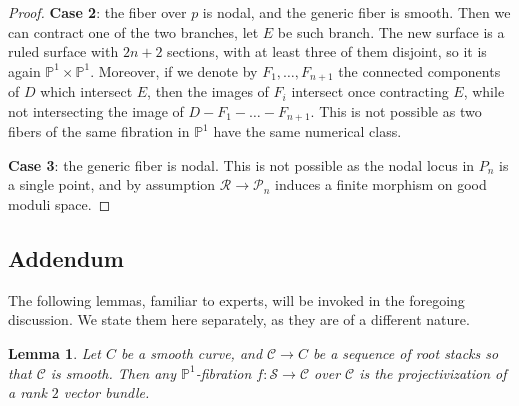 \documentclass[a4paper,12pt]{amsart}
\newcommand{\bP}{{\mathbb P}}
\newcommand{\sP}{{\mathscr{P}}}
\newcommand{\cR}{{\mathcal{R}}}
\newcommand\cS{{\mathcal{S}}}
\newcommand\cC{{\mathcal{C}}}
\newtheorem{lemma}[theorem]{Lemma}
\theoremstyle{definition}
\theoremstyle{remark}
\begin{document}
\begin{proof}
    \textbf{Case 2}: the fiber over $p$ is nodal, and the generic fiber is smooth. Then we can contract one of the two branches, let $E$ be such branch. The new surface is a ruled surface with $2n+2$ sections, with at least three of them disjoint,
    so it is again $\bP^1\times\bP^1$. Moreover, if we denote by $F_1, \ldots,F_{n+1}$ the connected components of $D$ which intersect $E$, then the images of $F_i$ intersect once contracting $E$, while not intersecting the image of $D- F_1- \ldots-F_{n+1}$. This is not possible as two fibers of the same fibration in $\bP^1$ have the same numerical class.

    \textbf{Case 3}: the generic fiber is nodal. This is not possible as the nodal locus in $P_n$ is a single point, and by assumption $\cR\to \sP_n$ induces a finite morphism on good moduli space.
\end{proof}
\subsection{Addendum}
The following lemmas, familiar to experts, will be invoked in the foregoing discussion. We state them here separately, as they are of a different nature.

\begin{lemma}\label{lemma_root_stack_of_a_curve_has_no_brauer}
    Let $C$ be a smooth curve, and $\cC\rightarrow C$ be a sequence of root stacks so that $\cC$ is smooth. Then any $\bP^1$-fibration $f\colon \cS\to \cC$ over $\cC$ is the projectivization of a rank $2$ vector bundle. 
\end{lemma}
\end{document}
